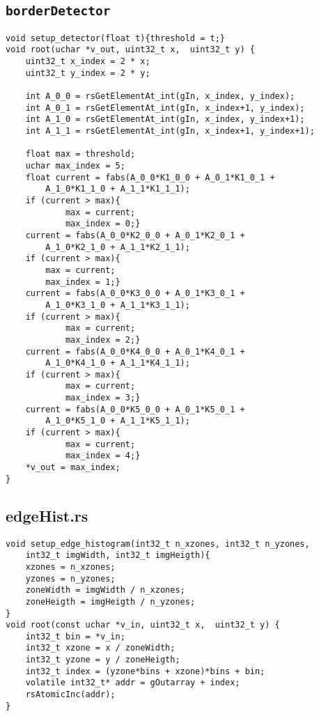 \begin{Anexos}
\subsection*{\texttt{borderDetector}}
\begin{lstlisting}
void setup_detector(float t){threshold = t;}
void root(uchar *v_out, uint32_t x,  uint32_t y) {
    uint32_t x_index = 2 * x;
    uint32_t y_index = 2 * y;

    int A_0_0 = rsGetElementAt_int(gIn, x_index, y_index);
    int A_0_1 = rsGetElementAt_int(gIn, x_index+1, y_index);
    int A_1_0 = rsGetElementAt_int(gIn, x_index, y_index+1);
    int A_1_1 = rsGetElementAt_int(gIn, x_index+1, y_index+1);

    float max = threshold;
    uchar max_index = 5;
    float current = fabs(A_0_0*K1_0_0 + A_0_1*K1_0_1 +
        A_1_0*K1_1_0 + A_1_1*K1_1_1);
    if (current > max){
            max = current;
            max_index = 0;}
    current = fabs(A_0_0*K2_0_0 + A_0_1*K2_0_1 +
        A_1_0*K2_1_0 + A_1_1*K2_1_1);
    if (current > max){
        max = current;
        max_index = 1;}
    current = fabs(A_0_0*K3_0_0 + A_0_1*K3_0_1 +
        A_1_0*K3_1_0 + A_1_1*K3_1_1);
    if (current > max){
            max = current;
            max_index = 2;}
    current = fabs(A_0_0*K4_0_0 + A_0_1*K4_0_1 +
        A_1_0*K4_1_0 + A_1_1*K4_1_1);
    if (current > max){
            max = current;
            max_index = 3;}
    current = fabs(A_0_0*K5_0_0 + A_0_1*K5_0_1 +
        A_1_0*K5_1_0 + A_1_1*K5_1_1);
    if (current > max){
            max = current;
            max_index = 4;}
    *v_out = max_index;
}
\end{lstlisting}

\subsection*{edgeHist.rs}
\begin{lstlisting}
void setup_edge_histogram(int32_t n_xzones, int32_t n_yzones,
    int32_t imgWidth, int32_t imgHeigth){
    xzones = n_xzones;
    yzones = n_yzones;
    zoneWidth = imgWidth / n_xzones;
    zoneHeigth = imgHeigth / n_yzones;
}
void root(const uchar *v_in, uint32_t x,  uint32_t y) {
    int32_t bin = *v_in;
    int32_t xzone = x / zoneWidth;
    int32_t yzone = y / zoneHeigth;
    int32_t index = (yzone*bins + xzone)*bins + bin;
    volatile int32_t* addr = gOutarray + index;
    rsAtomicInc(addr);
}
\end{lstlisting}

\end{Anexos}
